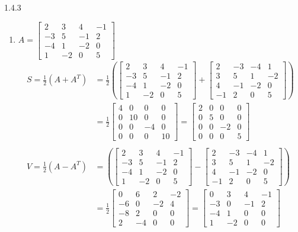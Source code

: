 \documentclass{article}
\theoremstyle{definition}
\begin{document}
\begin{prob}{1.4.3}
\begin{enumerate}[label=(\alph*)]
			\item $ A = \begin{bmatrix} 2 & 3 & 4 & -1 \\ -3 & 5 & -1 & 2 \\ -4 & 1 & -2 & 0 \\ 1 & -2 & 0 & 5 \end{bmatrix} $
				\begin{align*}
					S = \frac{1}{2}(A+A^T) &= \frac{1}{2} \left( \begin{bmatrix} 2 & 3 & 4 & -1 \\ -3 & 5 & -1 & 2 \\ -4 & 1 & -2 & 0 \\ 1 & -2 & 0 & 5 \end{bmatrix} + \begin{bmatrix} 2 & -3 & -4 & 1 \\ 3 & 5 & 1 & -2 \\ 4 & -1 & -2 & 0 \\ -1 & 2 & 0 & 5 \end{bmatrix} \right) \\
					&= \frac{1}{2} \begin{bmatrix} 4 & 0 & 0 & 0 \\ 0 & 10 & 0 & 0 \\ 0 & 0 & -4 & 0 \\ 0 & 0 & 0 & 10 \end{bmatrix} = \begin{bmatrix} 2 & 0 & 0 & 0 \\ 0 & 5 & 0 & 0 \\ 0 & 0 & -2 & 0 \\ 0 & 0 & 0 & 5 \end{bmatrix} \\ \\
					V = \frac{1}{2}(A-A^T) &= \left( \begin{bmatrix} 2 & 3 & 4 & -1 \\ -3 & 5 & -1 & 2 \\ -4 & 1 & -2 & 0 \\ 1 & -2 & 0 & 5 \end{bmatrix} - \begin{bmatrix} 2 & -3 & -4 & 1 \\ 3 & 5 & 1 & -2 \\ 4 & -1 & -2 & 0 \\ -1 & 2 & 0 & 5 \end{bmatrix} \right) \\
					&= \frac{1}{2} \begin{bmatrix} 0 & 6 & 2 & -2 \\ -6 & 0 & -2 & 4 \\ -8 & 2 & 0 & 0 \\ 2 & -4 & 0 & 0 \end{bmatrix} = \begin{bmatrix} 0 & 3 & 4 & -1 \\ -3 & 0 & -1 & 2 \\ -4 & 1 & 0 & 0 \\ 1 & -2 & 0 & 0 \end{bmatrix}

\end{align*}
\end{enumerate}
\end{prob}
\end{document}
